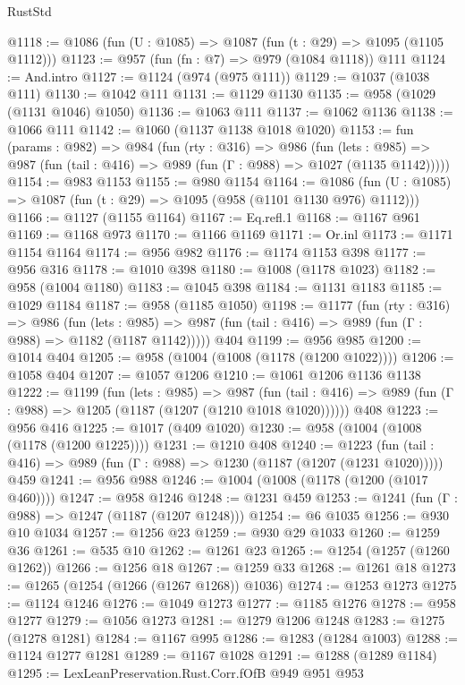 \begin{lexlean}{RustStd}
\begin{coremodule}
@1118 := @1086 (fun (U : @1085) => @1087 (fun (t : @29) => @1095 (@1105 @1112)))
@1123 := @957 (fun (fn : @7) => @979 (@1084 @1118)) @111
@1124 := And.intro
@1127 := @1124 (@974 (@975 @111))
@1129 := @1037 (@1038 @111)
@1130 := @1042 @111
@1131 := @1129 @1130
@1135 := @958 (@1029 (@1131 @1046) @1050)
@1136 := @1063 @111
@1137 := @1062 @1136
@1138 := @1066 @111
@1142 := @1060 (@1137 @1138 @1018 @1020)
@1153 := fun (params : @982) =>
  @984
    (fun (rty : @316) =>
    @986
      (fun (lets : @985) =>
      @987 (fun (tail : @416) => @989 (fun (Γ : @988) => @1027 (@1135 @1142)))))
@1154 := @983 @1153
@1155 := @980 @1154
@1164 := @1086 (fun (U : @1085) => @1087 (fun (t : @29) => @1095 (@958 (@1101 @1130 @976) @1112)))
@1166 := @1127 (@1155 @1164)
@1167 := Eq.refl.{1}
@1168 := @1167 @961
@1169 := @1168 @973
@1170 := @1166 @1169
@1171 := Or.inl
@1173 := @1171 @1154 @1164
@1174 := @956 @982
@1176 := @1174 @1153 @398
@1177 := @956 @316
@1178 := @1010 @398
@1180 := @1008 (@1178 @1023)
@1182 := @958 (@1004 @1180)
@1183 := @1045 @398
@1184 := @1131 @1183
@1185 := @1029 @1184
@1187 := @958 (@1185 @1050)
@1198 := @1177
    (fun (rty : @316) =>
    @986
      (fun (lets : @985) =>
      @987 (fun (tail : @416) => @989 (fun (Γ : @988) => @1182 (@1187 @1142)))))
    @404
@1199 := @956 @985
@1200 := @1014 @404
@1205 := @958 (@1004 (@1008 (@1178 (@1200 @1022))))
@1206 := @1058 @404
@1207 := @1057 @1206
@1210 := @1061 @1206 @1136 @1138
@1222 := @1199
    (fun (lets : @985) =>
    @987 (fun (tail : @416) => @989 (fun (Γ : @988) => @1205 (@1187 (@1207 (@1210 @1018 @1020))))))
    @408
@1223 := @956 @416
@1225 := @1017 (@409 @1020)
@1230 := @958 (@1004 (@1008 (@1178 (@1200 @1225))))
@1231 := @1210 @408
@1240 := @1223
    (fun (tail : @416) => @989 (fun (Γ : @988) => @1230 (@1187 (@1207 (@1231 @1020)))))
    @459
@1241 := @956 @988
@1246 := @1004 (@1008 (@1178 (@1200 (@1017 @460))))
@1247 := @958 @1246
@1248 := @1231 @459
@1253 := @1241 (fun (Γ : @988) => @1247 (@1187 (@1207 @1248)))
@1254 := @6 @1035
@1256 := @930 @10 @1034
@1257 := @1256 @23
@1259 := @930 @29 @1033
@1260 := @1259 @36
@1261 := @535 @10
@1262 := @1261 @23
@1265 := @1254 (@1257 (@1260 @1262))
@1266 := @1256 @18
@1267 := @1259 @33
@1268 := @1261 @18
@1273 := @1265 (@1254 (@1266 (@1267 @1268)) @1036)
@1274 := @1253 @1273
@1275 := @1124 @1246
@1276 := @1049 @1273
@1277 := @1185 @1276
@1278 := @958 @1277
@1279 := @1056 @1273
@1281 := @1279 @1206 @1248
@1283 := @1275 (@1278 @1281)
@1284 := @1167 @995
@1286 := @1283 (@1284 @1003)
@1288 := @1124 @1277 @1281
@1289 := @1167 @1028
@1291 := @1288 (@1289 @1184)
@1295 := LexLeanPreservation.Rust.Corr.fOfB @949 @951 @953

\end{coremodule}
\end{lexlean}
